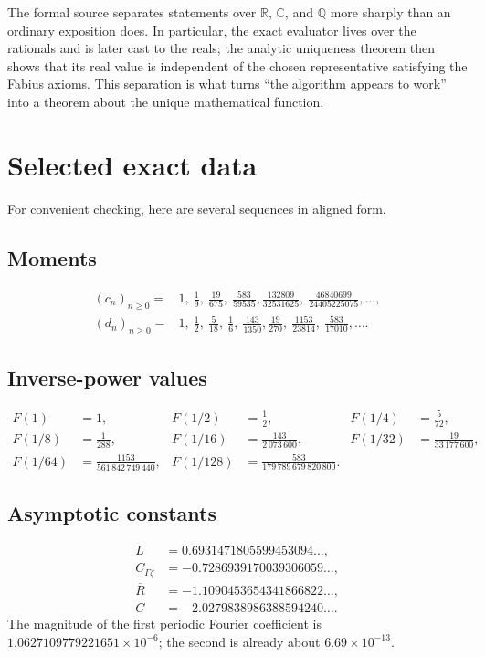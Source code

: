 \documentclass[11pt,oneside]{article}
\theoremstyle{definition}
\theoremstyle{remark}
\newcommand{\Q}{\mathbb Q}
\newcommand{\R}{\mathbb R}
\newcommand{\C}{\mathbb C}
\newcommand{\Ltwo}{L}
\begin{document}
The formal source separates statements over $\R$, $\C$, and $\Q$ more sharply than
an ordinary exposition does.  In particular, the exact evaluator lives over the
rationals and is later cast to the reals; the analytic uniqueness theorem then
shows that its real value is independent of the chosen representative satisfying
the Fabius axioms.  This separation is what turns ``the algorithm appears to work''
into a theorem about the unique mathematical function.

\section{Selected exact data}\label{app:data}

For convenient checking, here are several sequences in aligned form.

\subsection*{Moments}
\begin{align*}
(c_n)_{n\ge0}={}&1,\ \frac19,\ \frac{19}{675},\ \frac{583}{59535},
 \frac{132809}{32531625},\ \frac{46840699}{24405225075},\ldots,\\
(d_n)_{n\ge0}={}&1,\ \frac12,\ \frac5{18},\ \frac16,\ \frac{143}{1350},
 \frac{19}{270},\ \frac{1153}{23814},\ \frac{583}{17010},\ldots.
\end{align*}

\subsection*{Inverse-power values}
\begin{align*}
F(1)&=1,& F(1/2)&=\frac12,& F(1/4)&=\frac5{72},\\
F(1/8)&=\frac1{288},&
F(1/16)&=\frac{143}{2\,073\,600},&
F(1/32)&=\frac{19}{33\,177\,600},\\
F(1/64)&=\frac{1153}{561\,842\,749\,440},&
F(1/128)&=\frac{583}{179\,789\,679\,820\,800}.&&
\end{align*}

\subsection*{Asymptotic constants}
\begin{align*}
 \Ltwo&=0.6931471805599453094\ldots,\\
 C_{\Gamma\zeta}&=-0.7286939170039306059\ldots,\\
 \overline R&=-1.1090453654341866822\ldots,\\
 C&=-2.0279838986388594240\ldots.
\end{align*}
The magnitude of the first periodic Fourier coefficient is
$1.0627109779221651\times10^{-6}$; the second is already about
$6.69\times10^{-13}$.
\end{document}
